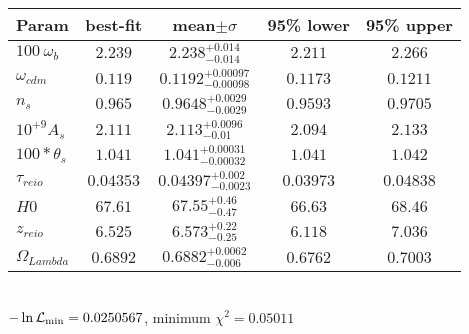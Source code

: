 \begin{tabular}{|l|c|c|c|c|} 
 \hline 
Param & best-fit & mean$\pm\sigma$ & 95\% lower & 95\% upper \\ \hline 
$100~\omega{}_{b }$ &$2.239$ & $2.238_{-0.014}^{+0.014}$ & $2.211$ & $2.266$ \\ 
$\omega{}_{cdm }$ &$0.119$ & $0.1192_{-0.00098}^{+0.00097}$ & $0.1173$ & $0.1211$ \\ 
$n_{s }$ &$0.965$ & $0.9648_{-0.0029}^{+0.0029}$ & $0.9593$ & $0.9705$ \\ 
$10^{+9}A_{s }$ &$2.111$ & $2.113_{-0.01}^{+0.0096}$ & $2.094$ & $2.133$ \\ 
$100*\theta{}_{s }$ &$1.041$ & $1.041_{-0.00032}^{+0.00031}$ & $1.041$ & $1.042$ \\ 
$\tau{}_{reio }$ &$0.04353$ & $0.04397_{-0.0023}^{+0.002}$ & $0.03973$ & $0.04838$ \\ 
$H0$ &$67.61$ & $67.55_{-0.47}^{+0.46}$ & $66.63$ & $68.46$ \\ 
$z_{reio }$ &$6.525$ & $6.573_{-0.25}^{+0.22}$ & $6.118$ & $7.036$ \\ 
$\Omega{}_{Lambda }$ &$0.6892$ & $0.6882_{-0.006}^{+0.0062}$ & $0.6762$ & $0.7003$ \\ 
\hline 
 \end{tabular} \\ 
$-\ln{\cal L}_\mathrm{min} =0.0250567$, minimum $\chi^2=0.05011$ \\ 
